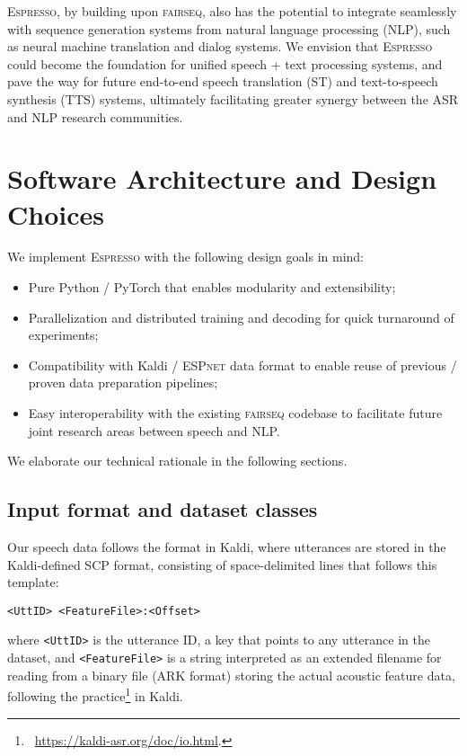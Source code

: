 \documentclass{article}
\def\espresso{\textsc{Espresso}\xspace}
\def\fairseq{\textsc{fairseq}\xspace}
\def\espnet{\textsc{ESPnet}\xspace}
\begin{document}
\espresso, by building upon \fairseq, also has the potential to integrate seamlessly with sequence generation systems from natural language processing (NLP), such as neural machine translation and dialog systems. We envision that \espresso could become the foundation for unified speech + text processing systems, and pave the way for future end-to-end speech translation (ST) and text-to-speech synthesis (TTS) systems, ultimately facilitating greater synergy between the ASR and NLP research communities.

\section{Software Architecture and Design Choices}
\label{sec:design}

We implement \espresso with the following design goals in mind:
\begin{itemize} \setlength\itemsep{0cm}
    \item Pure Python / PyTorch that enables modularity and extensibility;
    \item Parallelization and distributed training and decoding for quick turnaround of experiments;
    \item Compatibility with Kaldi / \espnet data format to enable reuse of previous / proven data preparation pipelines;
    \item Easy interoperability with the existing \fairseq codebase to facilitate future joint research areas between speech and NLP.
\end{itemize}
\noindent We elaborate our technical rationale in the following sections.

\subsection{Input format and dataset classes}
Our speech data follows the format in Kaldi, where utterances are stored in the Kaldi-defined SCP format, consisting of space-delimited lines that follows this template:
\begin{displayquote}
  \verb|<UttID> <FeatureFile>:<Offset>|
\end{displayquote}
\noindent where \texttt{<UttID>} is the utterance ID, a key that points to any utterance in the dataset, and \texttt{<FeatureFile>} is a string interpreted as an extended filename for reading from a binary file (ARK format) storing the actual acoustic feature data, following the practice\footnote{~\url{https://kaldi-asr.org/doc/io.html}.} in Kaldi.
\end{document}
